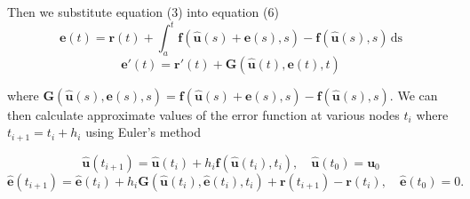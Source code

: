 \documentclass{article}
\newcommand{\V}{\textbf}
\begin{document}
Then we substitute equation (3) into equation (6)
\begin{equation}
    \V{e}(t) = \V{r}(t) + \int_a^t{\! \V{f}(\hat{\V{u}}(s) + \V{e}(s), s) - \V{f}(\hat{\V{u}}(s), s) \, \mathrm{ds}}
\end{equation}
\begin{equation}
    \V{e}'(t) = \V{r}'(t) + \V{G}(\hat{\V{u}}(t), \V{e}(t), t)
\end{equation}

where $\V{G}(\hat{\V{u}}(s), \V{e}(s), s) = \V{f}(\hat{\V{u}}(s) + \V{e}(s), s) - \V{f}(\hat{\V{u}}(s), s)$. 
We can then calculate approximate values of the error function at various 
nodes $t_i$ where $t_{i+1} = t_{i} + h_{i}$ using Euler's method

\begin{equation}
    \hat{\V{u}}(t_{i+1}) = \hat{\V{u}}(t_i) + h_i \V{f}(\hat{\V{u}}(t_i), t_i), \quad \hat{\V{u}}(t_0) = \V{u}_0
\end{equation}
\begin{equation}
    \hat{\V{e}}(t_{i+1}) = \hat{\V{e}}(t_i) + h_i\V{G}(\hat{\V{u}}(t_i), \hat{\V{e}}(t_i), t_i) + \V{r}(t_{i+1}) - \V{r}(t_i), \quad \hat{\V{e}}(t_0) = 0.
\end{equation}
\end{document}
